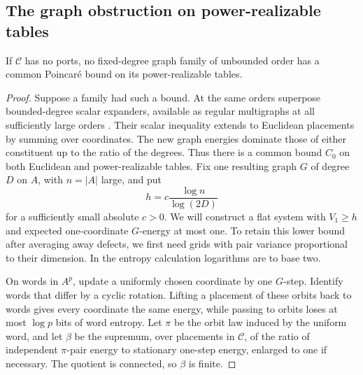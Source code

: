 \subsection{The graph obstruction on power-realizable tables}

\begin{lemma}\label{prod:power-obstruction}
If $\mathcal C$ has no ports, no fixed-degree graph family of unbounded
order has a common Poincar\'e bound on its power-realizable tables.
\end{lemma}
\begin{proof}
Suppose a family had such a bound. At the same orders superpose
bounded-degree scalar expanders, available as regular multigraphs at all
sufficiently large orders \cite{HLW}. Their scalar inequality extends
to Euclidean placements by summing over coordinates. The new graph
energies dominate those of either constituent up to the ratio of the
degrees. Thus there is a common bound $C_0$ on both Euclidean and
power-realizable tables. Fix one resulting graph $G$ of degree $D$ on
$A$, with $n=|A|$ large, and put
\[
 h=c\frac{\log n}{\log(2D)}
\]
for a sufficiently small absolute $c>0$. We will construct a flat
system with $V_1\ge h$ and expected one-coordinate $G$-energy at
most one. To retain this lower bound after averaging away defects, we
first need grids with pair variance proportional to their dimension.
In the entropy calculation logarithms are to base two.

On words in $A^p$, update a uniformly chosen coordinate by one $G$-step.
Identify words that differ by a cyclic rotation. Lifting a placement
of these orbits back to words gives every coordinate the same energy,
while passing to orbits loses at most $\log p$ bits of word entropy.
Let $\pi$ be the orbit law induced by the uniform word, and let $\beta$
be the supremum, over placements in $\mathcal C$, of the ratio of
independent $\pi$-pair energy to stationary one-step energy, enlarged
to one if necessary. The quotient is connected, so $\beta$ is finite.


\end{proof}

